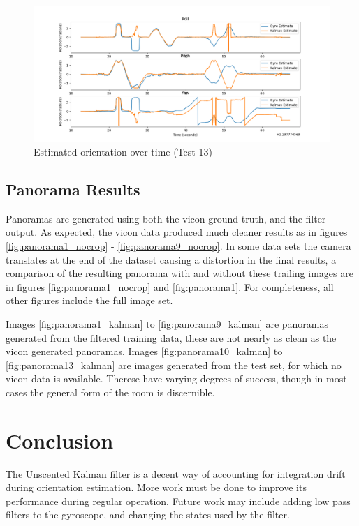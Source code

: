 \documentclass[a4paper]{article}
\begin{document}
\begin{figure}[h]
  \centering
    \includegraphics[width=1\textwidth]{rpy_testset13.png}
  \caption{Estimated orientation over time (Test 13)\label{fig:rpy_testset13}}
\end{figure}

\subsection{Panorama Results}

Panoramas are generated using both the vicon ground truth, and the filter output. As expected, the vicon data produced much cleaner results as in figures \ref{fig:panorama1_nocrop} - \ref{fig:panorama9_nocrop}. In some data sets the camera translates at the end of the dataset causing a distortion in the final results, a comparison of the resulting panorama with and without these trailing images are in figures \ref{fig:panorama1_nocrop} and \ref{fig:panorama1}. For completeness, all other figures include the full image set.

Images \ref{fig:panorama1_kalman} to \ref{fig:panorama9_kalman} are panoramas generated from the filtered training data, these are not nearly as clean as the vicon generated panoramas. Images \ref{fig:panorama10_kalman} to \ref{fig:panorama13_kalman} are images generated from the test set, for which no vicon data is available. Therese have varying degrees of success, though in most cases the general form of the room is discernible.

\section{Conclusion}

The Unscented Kalman filter is a decent way of accounting for integration drift during orientation estimation. More work must be done to improve its performance during regular operation. Future work may include adding low pass filters to the gyroscope, and changing the states used by the filter.
\end{document}
